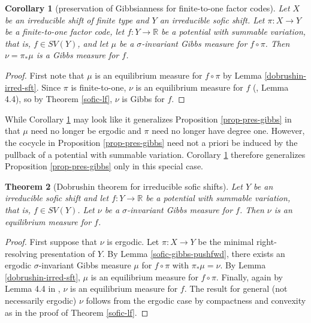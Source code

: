\documentclass{amsproc}
\newtheorem{theorem}{Theorem}
\numberwithin{theorem}{section}
\newtheorem{corollary}[theorem]{Corollary}
\theoremstyle{remark}
\theoremstyle{definition}
\newcommand{\R}{\mathbb{R}}
\theoremstyle{plain}
\begin{document}
\begin{corollary}[preservation of Gibbsianness for finite-to-one factor codes]\label{irred-fin-1}
Let $X$ be an irreducible shift of finite type and $Y$ an irreducible sofic shift. Let $\pi: X \to Y$ be a finite-to-one factor code, let $f\colon Y \to \R$  be a potential with summable variation, that is, $f \in SV(Y)$, and let $\mu$ be a $\sigma$-invariant Gibbs measure for $f \circ \pi$. Then $\nu = \pi_* \mu$ is a Gibbs measure for $f$.
\end{corollary}

\begin{proof}
First note that $\mu$ is an equilibrium measure for $f \circ \pi$ by Lemma \ref{dobrushin-irred-sft}. Since $\pi$ is finite-to-one, $\nu$ is an equilibrium measure for $f$ (\cite{yoo2018decomposition}, Lemma 4.4), so by Theorem \ref{sofic-lf}, $\nu$ is Gibbs for $f$.
\end{proof}

While Corollary \ref{irred-fin-1} may look like it generalizes Proposition \ref{prop-pres-gibbs} in that $\mu$ need no longer be ergodic and $\pi$ need no longer have degree one. However, the cocycle in Proposition \ref{prop-pres-gibbs} need not a priori be induced by the pullback of a potential with summable variation. Corollary \ref{irred-fin-1} therefore generalizes Proposition \ref{prop-pres-gibbs} only in this special case.

\begin{theorem}[Dobrushin theorem for irreducible sofic shifts]\label{sofic-dobrushin}
Let $Y$ be an irreducible sofic shift and let $f\colon Y \to \R$  be a potential with summable variation, that is, $f \in SV(Y)$. Let $\nu$ be a $\sigma$-invariant Gibbs measure for $f$. Then $\nu$ is an equilibrium measure for $f$.
\end{theorem}

\begin{proof}
First suppose that $\nu$ is ergodic. Let $\pi: X \to Y$ be the minimal right-resolving presentation of $Y$. By Lemma \ref{sofic-gibbs-pushfwd}, there exists an ergodic $\sigma$-invariant Gibbs measure $\mu$ for $f \circ \pi$ with $\pi_* \mu = \nu$. By Lemma \ref{dobrushin-irred-sft}, $\mu$ is an equilibrium measure for $f \circ \pi$. Finally, again by Lemma 4.4 in \cite{yoo2018decomposition}, $\nu$ is an equilibrium measure for $f$. The result for general (not necessarily ergodic) $\nu$ follows from the ergodic case by compactness and convexity as in the proof of Theorem \ref{sofic-lf}.
\end{proof}
\end{document}
